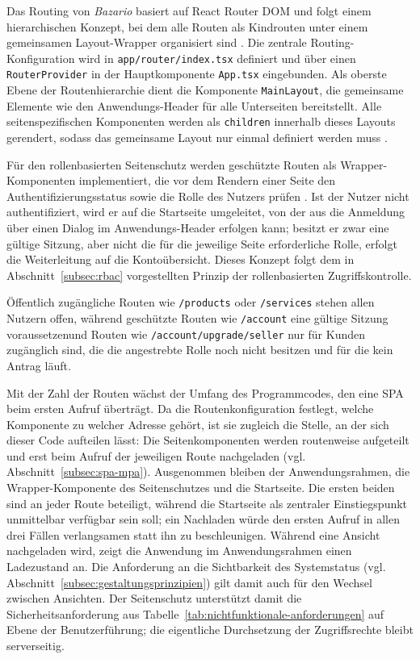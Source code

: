 Das Routing von \textit{Bazario} basiert auf React Router DOM und
folgt einem hierarchischen Konzept, bei dem alle Routen als
Kindrouten unter einem gemeinsamen Layout-Wrapper organisiert sind
\cite{reactrouter_docs}. Die zentrale Routing-Konfiguration wird in
\texttt{app/router/index.tsx} definiert und über einen
\texttt{RouterProvider} in der Hauptkomponente \texttt{App.tsx}
eingebunden. Als oberste Ebene der Routenhierarchie dient die
Komponente \texttt{MainLayout}, die gemeinsame Elemente wie den
Anwendungs-Header für alle Unterseiten bereitstellt. Alle
seitenspezifischen Komponenten werden als \texttt{children}
innerhalb dieses Layouts gerendert, sodass das gemeinsame Layout nur
einmal definiert werden muss \cite{reactrouter_docs}.

Für den rollenbasierten Seitenschutz werden geschützte Routen als
Wrapper-Komponenten implementiert, die vor dem Rendern einer Seite
den Authentifizierungsstatus sowie die Rolle des Nutzers prüfen
\cite{reactrouter_docs, wieruch_protected_routes}. Ist der Nutzer
nicht authentifiziert, wird er auf die Startseite umgeleitet, von der
aus die Anmeldung über einen Dialog im Anwendungs-Header erfolgen
kann; besitzt er zwar eine gültige Sitzung, aber nicht die für die
jeweilige Seite erforderliche Rolle, erfolgt die Weiterleitung auf
die Kontoübersicht. Dieses Konzept folgt dem in
Abschnitt~\ref{subsec:rbac} vorgestellten Prinzip der
rollenbasierten Zugriffskontrolle.

Öffentlich zugängliche Routen wie \texttt{/products} oder
\texttt{/services} stehen allen Nutzern offen, während geschützte
Routen wie \texttt{/account} eine gültige Sitzung voraussetzenund Routen wie \texttt{/account\allowbreak/upgrade\allowbreak/seller}
nur für Kunden zugänglich sind, die die angestrebte Rolle noch nicht
besitzen und für die kein Antrag läuft.

Mit der Zahl der Routen wächst der Umfang des Programmcodes, den eine
\acs{SPA} beim ersten Aufruf überträgt. Da die Routenkonfiguration
festlegt, welche Komponente zu welcher Adresse gehört, ist sie
zugleich die Stelle, an der sich dieser Code aufteilen lässt: Die
Seitenkomponenten werden routenweise aufgeteilt und erst beim Aufruf
der jeweiligen Route nachgeladen (vgl.
Abschnitt~\ref{subsec:spa-mpa}). Ausgenommen bleiben der
Anwendungsrahmen, die Wrapper-Komponente des Seitenschutzes und die
Startseite. Die ersten beiden sind an jeder Route beteiligt, während
die Startseite als zentraler Einstiegspunkt unmittelbar verfügbar sein
soll; ein Nachladen würde den ersten Aufruf in allen drei Fällen
verlangsamen statt ihn zu beschleunigen.
Während eine Ansicht nachgeladen wird, zeigt die Anwendung im
Anwendungsrahmen einen Ladezustand an. Die Anforderung an die
Sichtbarkeit des Systemstatus (vgl.
Abschnitt~\ref{subsec:gestaltungsprinzipien}) gilt damit auch für den
Wechsel zwischen Ansichten.
Der Seitenschutz unterstützt damit die Sicherheitsanforderung aus
Tabelle~\ref{tab:nichtfunktionale-anforderungen} auf Ebene der
Benutzerführung; die eigentliche Durchsetzung der Zugriffsrechte
bleibt serverseitig.


